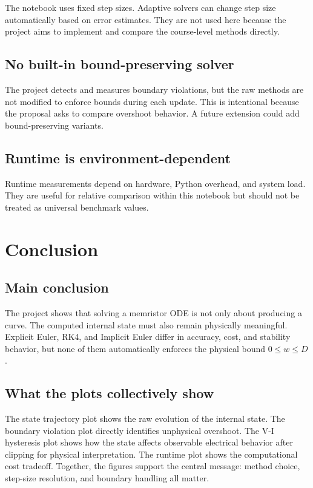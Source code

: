 \documentclass[11pt]{article}
\begin{document}
The notebook uses fixed step sizes. Adaptive solvers can change step size automatically based on error estimates. They are not used here because the project aims to implement and compare the course-level methods directly.

\subsection{No built-in bound-preserving solver}

The project detects and measures boundary violations, but the raw methods are not modified to enforce bounds during each update. This is intentional because the proposal asks to compare overshoot behavior. A future extension could add bound-preserving variants.

\subsection{Runtime is environment-dependent}

Runtime measurements depend on hardware, Python overhead, and system load. They are useful for relative comparison within this notebook but should not be treated as universal benchmark values.

\section{Conclusion}

\subsection{Main conclusion}

The project shows that solving a memristor ODE is not only about producing a curve. The computed internal state must also remain physically meaningful. Explicit Euler, RK4, and Implicit Euler differ in accuracy, cost, and stability behavior, but none of them automatically enforces the physical bound \(0 \leq w \leq D\).

\subsection{What the plots collectively show}

The state trajectory plot shows the raw evolution of the internal state. The boundary violation plot directly identifies unphysical overshoot. The V-I hysteresis plot shows how the state affects observable electrical behavior after clipping for physical interpretation. The runtime plot shows the computational cost tradeoff. Together, the figures support the central message: method choice, step-size resolution, and boundary handling all matter.
\end{document}
